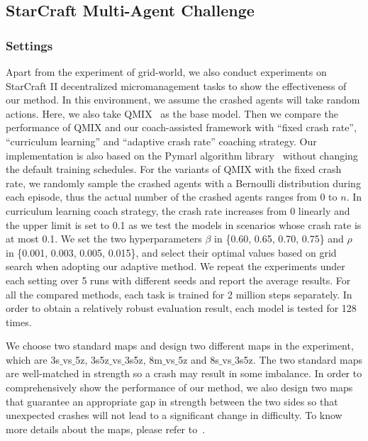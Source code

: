 \documentclass{article}
\begin{document}
\subsection{StarCraft Multi-Agent Challenge}
\subsubsection{Settings}
Apart from the experiment of grid-world, we also conduct experiments on StarCraft II decentralized micromanagement tasks to show the effectiveness of our method. In this environment, we assume the crashed agents will take random actions. Here, we also take QMIX~\cite{rashid2018qmix} as the base model. 
Then we compare the performance of QMIX and our coach-assisted framework with ``fixed crash rate'', ``curriculum learning'' and ``adaptive crash rate'' coaching strategy. Our implementation is also based on the Pymarl algorithm library~\cite{samvelyan19smac} without changing the default training schedules. 
For the variants of QMIX with the fixed crash rate, we randomly sample the crashed agents with a Bernoulli distribution during each episode, thus the actual number of the crashed agents ranges from 0 to $n$. In curriculum learning coach strategy, the crash rate increases from 0 linearly and the upper limit is set to 0.1 as we test the models in scenarios whose crash rate is at most 0.1. We set the two hyperparameters $\beta$ in \{0.60, 0.65, 0.70, 0.75\} and $\rho$ in \{0.001, 0.003, 0.005, 0.015\}, and select their optimal values based on grid search when adopting our adaptive method.
We repeat the experiments under each setting over 5 runs with different seeds and report the average results.
For all the compared methods, each task is trained for 2 million steps separately. 
In order to obtain a relatively robust evaluation result, each model is tested for 128 times.

We choose two standard maps and design two different maps in the experiment, which are 3s$\_$vs$\_$5z, 3s5z$\_$vs$\_$3s5z, 8m$\_$vs$\_$5z and 8s$\_$vs$\_$3s5z. The two standard maps are well-matched in strength so a crash may result in some imbalance. In order to comprehensively show the performance of our method, we also design two maps that guarantee an appropriate gap in strength between the two sides so that unexpected crashes will not lead to a significant change in difficulty.
To know more details about the maps, please refer to~\cite{samvelyan19smac}. 
\end{document}
